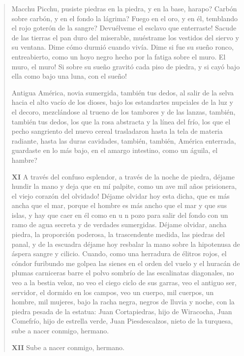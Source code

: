 \documentclass[12pt]{article}
\begin{document}
\begin{verse}
Macchu Picchu, pusiste  
piedras en la piedra, y en la base, harapo?  
Carbón sobre carbón, y en el fondo la lágrima?  
Fuego en el oro, y en él, temblando el rojo  
goterón de la sangre?  
Devuélveme el esclavo que enterraste!  
Sacude de las tierras el pan duro  
del miserable, muéstrame los vestidos  
del siervo y su ventana.  
Dime cómo durmió cuando vivía.  
Dime si fue su sueño  
ronco, entreabierto, como un hoyo negro  
hecho por la fatiga sobre el muro.  
El muro, el muro! Si sobre su sueño  
gravitó cada piso de piedra, y si cayó bajo ella  
como bajo una luna, con el sueño!  
	
Antigua América, novia sumergida,  
también tus dedos,  
al salir de la selva hacia el alto vacío de los dioses,  
bajo los estandartes nupciales de la luz y el decoro,  
mezclándose al trueno de los tambores y de las lanzas,  
también, también tus dedos,  
los que la rosa abstracta y la línea del frío, los  
que el pecho sangriento del nuevo cereal trasladaron  
hasta la tela de materia radiante, hasta las duras cavidades,  
también, también, América enterrada, guardaste en lo más bajo,  
en el amargo intestino, como un águila, el hambre?  
	
\textbf{ XI}
A través del confuso esplendor,  
a través de la noche de piedra, déjame hundir la mano  
y deja que en mí palpite, como un ave mil años prisionera,  
el viejo corazón del olvidado!  
Déjame olvidar hoy esta dicha, que es más ancha que el mar,  
porque el hombre es más ancho que el mar y que sus islas,  
y hay que caer en él como en u n pozo para salir del fondo  
con un ramo de agua secreta y de verdades sumergidas.  
Déjame olvidar, ancha piedra, la proporción poderosa,  
la trascendente medida, las piedras del panal,  
y de la escuadra déjame hoy resbalar  
la mano sobre la hipotenusa de áspera sangre y cilicio.  
Cuando, como una herradura de élitros rojos, el cóndor furibundo  
me golpea las sienes en el orden del vuelo  
y el huracán de plumas carniceras barre el polvo sombrío  
de las escalinatas diagonales, no veo a la bestia veloz,  
no veo el ciego ciclo de sus garras,  
veo el antiguo ser, servidor, el dormido  
en los campos, veo un cuerpo, mil cuerpos, un hombre, mil mujeres,  
bajo la racha negra, negros de lluvia y noche,  
con la piedra pesada de la estatua:  
Juan Cortapiedras, hijo de Wiracocha,  
Juan Comefrío, hijo de estrella verde,  
Juan Piesdescalzos, nieto de la turquesa,  
sube a nacer conmigo, hermano.  

\textbf{ XII}
Sube a nacer conmigo, hermano.  
	

\end{verse}
\end{document}
